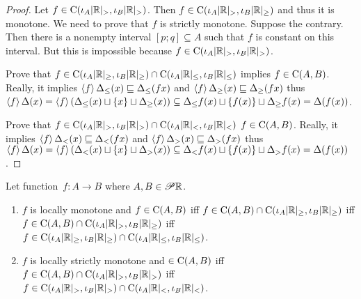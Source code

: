 \begin{proof}
Let $f\in\mathrm{C}(\iota_{A}|\mathbb{R}|_{>},\iota_{B}|\mathbb{R}|_{>})$. Then $f\in\mathrm{C}(\iota_{A}|\mathbb{R}|_{>},\iota_{B}|\mathbb{R}|_{\geq})$ and thus it is monotone.
We need to prove that $f$ is strictly monotone.
Suppose the contrary. Then there is a nonempty interval $[p;q]\subseteq {A}$ such that $f$ is constant on this interval.
But this is impossible because $f\in\mathrm{C}(\iota_{A}|\mathbb{R}|_{>},\iota_{B}|\mathbb{R}|_{>})$.

Prove that $f\in\mathrm{C}(\iota_{A}|\mathbb{R}|_{\geq},\iota_{B}|\mathbb{R}|_{\geq})\cap
\mathrm{C}(\iota_{A}|\mathbb{R}|_{\leq},\iota_{B}|\mathbb{R}|_{\leq})$ implies
$f\in\mathrm{C}({A},{B})$. Really, it implies
$\left\langle f\right\rangle\Delta_{\leq}(x)\sqsubseteq\Delta_{\leq}(fx)$ and $\left\langle f\right\rangle\Delta_{\geq}(x)\sqsubseteq\Delta_{\geq}(fx)$
thus $\left\langle f\right\rangle\Delta(x) = \left\langle f\right\rangle(\Delta_{\leq}(x)\sqcup\{x\}\sqcup\Delta_{\geq}(x)) \subseteq
\Delta_{\leq}f(x)\sqcup\{f(x)\}\sqcup\Delta_{\geq}f(x) =
\Delta(f(x))$.

Prove that $f\in\mathrm{C}(\iota_{A}|\mathbb{R}|_{>},\iota_{B}|\mathbb{R}|_{>})\cap
\mathrm{C}(\iota_{A}|\mathbb{R}|_{<},\iota_{B}|\mathbb{R}|_{<})$
$f\in\mathrm{C}({A},{B})$. Really, it implies
$\left\langle f\right\rangle\Delta_{<}(x)\sqsubseteq\Delta_{<}(fx)$ and $\left\langle f\right\rangle\Delta_{>}(x)\sqsubseteq\Delta_{>}(fx)$
thus $\left\langle f\right\rangle\Delta(x) = \left\langle f\right\rangle(\Delta_{<}(x)\sqcup\{x\}\sqcup\Delta_{>}(x)) \subseteq
\Delta_{<}f(x)\sqcup\{f(x)\}\sqcup\Delta_{>}f(x) = \Delta(f(x))$.
\end{proof}

\begin{thm}
Let function~$f:A\rightarrow B$ where $A,B\in\mathscr{P}\mathbb{R}$.
\begin{enumerate}
\item $f$ is locally monotone and $f\in\mathrm{C}(A,B)$ iff
$f\in\mathrm{C}(A,B)\cap\mathrm{C}(\iota_A|\mathbb{R}|_{\geq},\iota_B|\mathbb{R}|_{\geq})$ iff
$f\in\mathrm{C}(A,B)\cap\mathrm{C}(\iota_A|\mathbb{R}|_{>},\iota_B|\mathbb{R}|_{\geq})$ iff
$f\in\mathrm{C}(\iota_A|\mathbb{R}|_{\geq},\iota_B|\mathbb{R}|_{\geq})\cap
\mathrm{C}(\iota_A|\mathbb{R}|_{\leq},\iota_B|\mathbb{R}|_{\leq})$.
\item $f$ is locally strictly monotone and $\in\mathrm{C}(A,B)$ iff
$f\in\mathrm{C}(A,B)\cap\mathrm{C}(\iota_A|\mathbb{R}|_{>},\iota_B|\mathbb{R}|_{>})$ iff
$f\in\mathrm{C}(\iota_A|\mathbb{R}|_{>},\iota_B|\mathbb{R}|_{>})\cap
\mathrm{C}(\iota_A|\mathbb{R}|_{<},\iota_B|\mathbb{R}|_{<})$.
\end{enumerate}
\end{thm}


